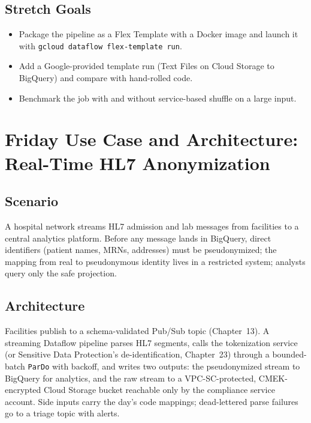 \subsection*{Stretch Goals}
\begin{itemize}
    \item Package the pipeline as a Flex Template with a Docker image and launch it with \texttt{gcloud dataflow flex-template run}.
    \item Add a Google-provided template run (Text Files on Cloud Storage to BigQuery) and compare with hand-rolled code.
    \item Benchmark the job with and without service-based shuffle on a large input.
\end{itemize}

\section{Friday Use Case and Architecture: Real-Time HL7 Anonymization}

\subsection{Scenario}
A hospital network streams HL7 admission and lab messages from facilities to a central analytics platform. Before any message lands in BigQuery, direct identifiers (patient names, MRNs, addresses) must be pseudonymized; the mapping from real to pseudonymous identity lives in a restricted system; analysts query only the safe projection.

\subsection{Architecture}
Facilities publish to a schema-validated Pub/Sub topic (Chapter~13). A streaming Dataflow pipeline parses HL7 segments, calls the tokenization service (or Sensitive Data Protection's de-identification, Chapter~23) through a bounded-batch \texttt{ParDo} with backoff, and writes two outputs: the pseudonymized stream to BigQuery for analytics, and the raw stream to a VPC-SC-protected, CMEK-encrypted Cloud Storage bucket reachable only by the compliance service account. Side inputs carry the day's code mappings; dead-lettered parse failures go to a triage topic with alerts.

